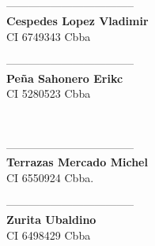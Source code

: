 \documentclass[11pt,letterpaper]{report}
\begin{document}
~\\
~\\
~\\
~\\
\begin{minipage}{0.4\textwidth}
\begin{center}
-----------------------------------\\
{\bf Cespedes Lopez Vladimir }\\
 CI 6749343 Cbba\\
\end{center}
\end{minipage}
\begin{minipage}{0.47\textwidth}
\begin{center}
-----------------------------------\\
{\bf Pe\~na Sahonero Erikc }\\
CI 5280523 Cbba
\end{center}
\end{minipage}
~\\\vspace{7em}

\begin{minipage}{0.4\textwidth}
\begin{center}
-----------------------------------\\
{\bf Terrazas Mercado Michel }\\
CI 6550924 Cbba.\\
\end{center}
\end{minipage}
\begin{minipage}{0.47\textwidth}
\begin{center}
-----------------------------------\\
{\bf Zurita Ubaldino }\\
CI 6498429 Cbba
\end{center}
\end{minipage}
\end{document}
